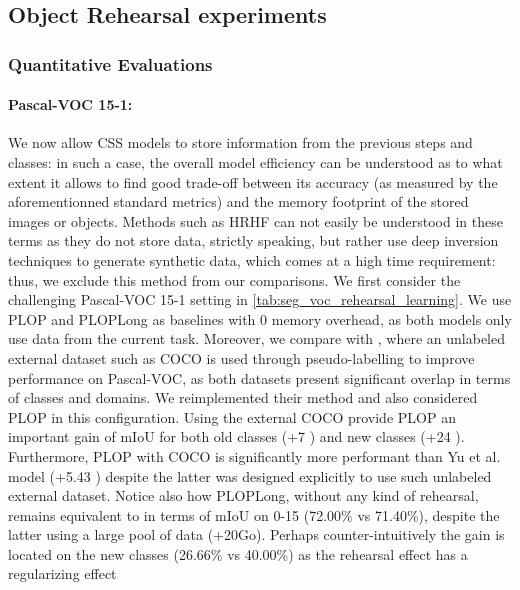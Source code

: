 \subsection{Object Rehearsal experiments}

\subsubsection{Quantitative Evaluations}



\paragraph{Pascal-VOC 15-1:\,} We now allow \ac{CSS} models to store information from the previous
steps and classes: in such a case, the overall model efficiency can be understood as to what extent
it allows to find good trade-off between its accuracy (as measured by the aforementionned standard
metrics) and the memory footprint of the stored images or objects. Methods such as HRHF
\cite{huang2021halfrealhalffake} can not easily be understood in these terms as they do not store
data, strictly speaking, but rather use deep inversion \cite{yin20deepinversion} techniques to
generate synthetic data, which comes at a high time requirement: thus, we exclude this method from
our comparisons. We first consider the challenging Pascal-VOC 15-1 setting in
\autoref{tab:seg_voc_rehearsal_learning}. We use PLOP and PLOPLong as baselines with 0 memory
overhead, as both models only use data from the current task. Moreover, we compare with
\cite{yu2020continualsegmentationselftraining}, where an unlabeled external dataset such as COCO
\cite{lin2014mscocodataset} is used through pseudo-labelling to improve performance on Pascal-VOC,
as both datasets present significant overlap in terms of classes and domains. We reimplemented their
method and also considered PLOP in this configuration. Using the external COCO provide PLOP an
important gain of \ac{mIoU} for both old classes (+7 \pp) and new classes (+24
\pp). Furthermore, PLOP with COCO is significantly more performant than Yu et al. model
(+5.43 \pp) despite the latter was designed explicitly to use such unlabeled external
dataset. Notice also how PLOPLong, without any kind of rehearsal, remains equivalent to
\cite{yu2020continualsegmentationselftraining} in terms of \ac{mIoU} on 0-15 (72.00\% vs 71.40\%),
despite the latter using a large pool of data (+20Go). Perhaps counter-intuitively the gain is
located on the new classes (26.66\% vs 40.00\%) as the rehearsal effect has a regularizing effect
